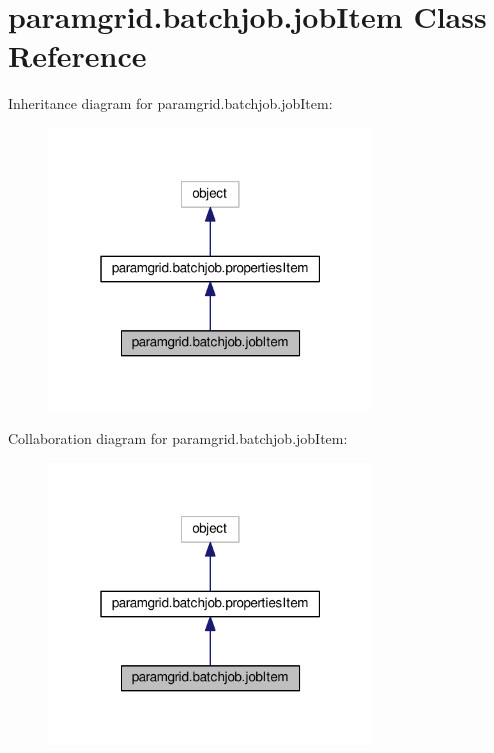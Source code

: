 \hypertarget{classparamgrid_1_1batchjob_1_1jobItem}{}\section{paramgrid.\+batchjob.\+job\+Item Class Reference}
\label{classparamgrid_1_1batchjob_1_1jobItem}


Inheritance diagram for paramgrid.\+batchjob.\+job\+Item\+:
\nopagebreak
\begin{figure}[H]
\begin{center}
\leavevmode
\includegraphics[width=244pt]{classparamgrid_1_1batchjob_1_1jobItem__inherit__graph}
\end{center}
\end{figure}


Collaboration diagram for paramgrid.\+batchjob.\+job\+Item\+:
\nopagebreak
\begin{figure}[H]
\begin{center}
\leavevmode
\includegraphics[width=244pt]{classparamgrid_1_1batchjob_1_1jobItem__coll__graph}
\end{center}
\end{figure}
